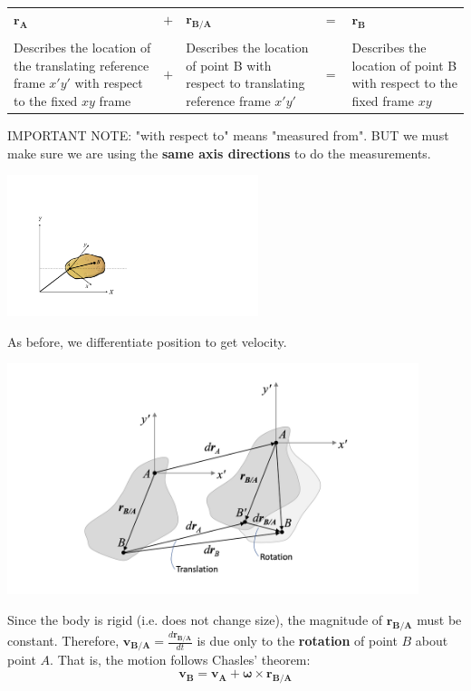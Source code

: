 \documentclass[12pt,letterpaper,twoside]{report}
\begin{document}
\begin{center}
\begin{tabu} to 1\textwidth {  X[c]  X[c] X[c] X[c]  X[c]  }
$\bm{r_A}$ & $+$ & $\bm{r_{B/A}}$ & $=$ & $\bm{r_B}$\\
 & & & & \\
Describes the location of the translating reference frame  $x'y'$ with respect to the fixed $xy$ frame & $+$ & Describes the location of point B with respect to translating reference frame $x'y'$ & $=$ & Describes the location of point B with respect to the fixed frame $xy$\\
\end{tabu}
\end{center}

\newpage

IMPORTANT NOTE: "with respect to" means "measured from".  BUT we must make sure we are using the \textbf{same axis directions} to do the measurements. 

\includegraphics[trim={3cm 0cm 14cm 5cm},clip,width=0.55\textwidth, center]{Slide12}

As before, we differentiate position to get velocity.  

\includegraphics[trim={0cm 0cm 0cm 1.5cm},clip,width=0.9\textwidth, center]{Slide13}

Since the body is rigid (i.e. does not change size), the magnitude of $\bm{r_{B/A}}$ must be constant. Therefore, $\displaystyle \bm{v_{B/A}} = \frac{d\bm{r_{B/A}}}{dt}$ is due only to the \textbf{rotation} of point $B$ about point $A$.  That is, the motion follows Chasles' theorem:
\[ \bm{v_B}=\bm{v_A} + \bm{\omega} \times \bm{r_{B/A}} \]
\raggedbottom
\end{document}
